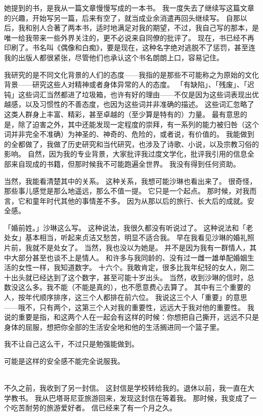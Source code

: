 \documentclass[UTF8]{ctexart}
\begin{document}
她提到的书，是我从一篇文章慢慢写成的一本书。
我一度失去了继续写这篇文章的兴趣，开始写另一篇，后来有空了，就当成业余消遣再回头继续写。
自那以后，我和别人合著了两本书，适时地满足对我的期望，不过，我自己写的那本，是唯一给我带来一些外界关注的，更不必说来自同僚的批评了。
现在，书已经不再印刷了。书名叫《偶像和白痴》，要是现在，这种名字绝对逃脱不了惩罚，甚至连我的出版人都很紧张，尽管他们也承认这个书名朗朗上口，容易记住。

我研究的是不同文化背景的人们的态度——我指的是那些不可能称之为原始的文化背景——研究这些人对精神或者身体异常的人的态度。
「有缺陷」、「残废」、「迟钝」这些词汇当然都进了垃圾箱，也许有好的理由——不仅是因为这些词表现出优越感，以及习惯性的不善态度，也因为这些词并非准确的描述。
这些词汇忽略了这类人群身上丰富、精彩，甚至卓越的（至少算是特有的）力量。
最有意思的是，除了迫害之外，其中还能发现一定程度的崇拜，有一系列的能力被归咎（这个词并非完全不准确）为神圣的、神奇的、危险的，或者说，有价值的。
我能做到的全都做了，我做了历史研究和当代研究，也涉及了诗歌、小说，以及宗教习俗的影响。
自然，因为我的专业背景，大家批评我过度文学化，批评我引用的信息全部来自现成的书籍，但那时候我不可能跑遍全世界。
我没有得到任何资助。

当然，我能看清楚其中的关系。
这种关系，我想可能沙琳也看出来了。
很奇怪，那些事儿感觉是那么地遥远，那么不值一提。
它只是一个起点。
那时候，对我而言，它和童年时代其他的事情差不多。
因为从那以后的旅行、长大后的成就。安全感。

「婚前姓。」沙琳这么写。
这种说法，我很久都没有听说过了。
这种说法和「老处女」基本相当，听起来贞洁又愁苦，明显不适合我。
早在我看见沙琳的婚礼照片前，我就不是处女了。
当然，我也没以为她是。
并不是因为我有一群情人，其中大部分甚至也谈不上是情人。
和许多与我同龄的、没有过一雌一雄单配婚姻生活的女性一样，我知道数字。
十六个。我敢肯定，很多比我年纪轻的女人，刚二十出头就已经达到了这个数字，甚至可能十岁出头。
当然，收到沙琳的信时，总数没这么多。我不能（不能是真的），也不愿意费心去算了。
其中有三个重要的人，按年代顺序排序，这三个人都排在前六位。
我说这三个人「重要」的意思——哦不，只有两个，这第三个人对我的重要性，远远大于我对他的重要性。
我说的重要是指，和这两个人在一起会有这样的时候：你想把自己撕开，远远不只是身体的屈服，想把你全部的生活安全地和他的生活搁进同一个篮子里。

我不让自己这么干，不过只是勉强能做到。

可能是这样的安全感不能完全说服我。

~\\

不久之前，我收到了另一封信。
这封信是学校转给我的。退休以前，我一直在大学教书。
我从巴塔哥尼亚旅游回来，发现这封信在等着我。
那时候，我变成了一个吃苦耐劳的旅游爱好者。
信已经来了有一个月之久。
\end{document}
